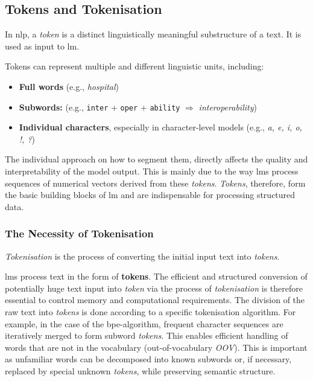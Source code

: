 \subsection{Tokens and Tokenisation}\label{subsec:token_prel}
%
\begin{definition}\label{def:token}
    In \ac{nlp}, a \textit{token} is a distinct linguistically meaningful substructure of a text.
    It is used as input to \ac{lm}.
\end{definition}
%
Tokens can represent multiple and different linguistic units, including:
\begin{itemize}
  \item \textbf{Full words} (e.g., \textit{hospital})
  \item \textbf{Subwords:} (e.g., \texttt{inter} + \texttt{oper} + \texttt{ability} $\Rightarrow$ \textit{interoperability})
  \item \textbf{Individual characters}, especially in character-level models (e.g., \textit{a, e, i, o, !, ?})
\end{itemize}
%
The individual approach on how to segment them, directly affects the quality and interpretability of the model output.
This is mainly due to the way \acp{lm} process sequences of numerical vectors derived from these \textit{tokens}.
\textit{Tokens}, therefore, form the basic building blocks of \ac{lm} and are indispensable for processing structured data.
%
\subsubsection{The Necessity of Tokenisation}
%
\begin{definition}
    \textit{Tokenisation} is the process of converting the initial input text into \textit{tokens}.
\end{definition}
%
\acp{lm} process text in the form of \textbf{tokens}. 
The efficient and structured conversion of potentially huge text input into \textit{token} via the process of \textit{tokenisation} is therefore essential to control memory and computational requirements.
%
The division of the raw text into \textit{tokens} is done according to a specific tokenisation algorithm.
For example, in the case of the \ac{bpe}-algorithm, frequent character sequences are iteratively merged to form subword \textit{tokens}.
This enables efficient handling of words that are not in the vocabulary (out-of-vocabulary \textit{OOV}).
This is important as unfamiliar words can be decomposed into known subwords or, if necessary, replaced by special unknown \textit{tokens}, while preserving semantic structure.
